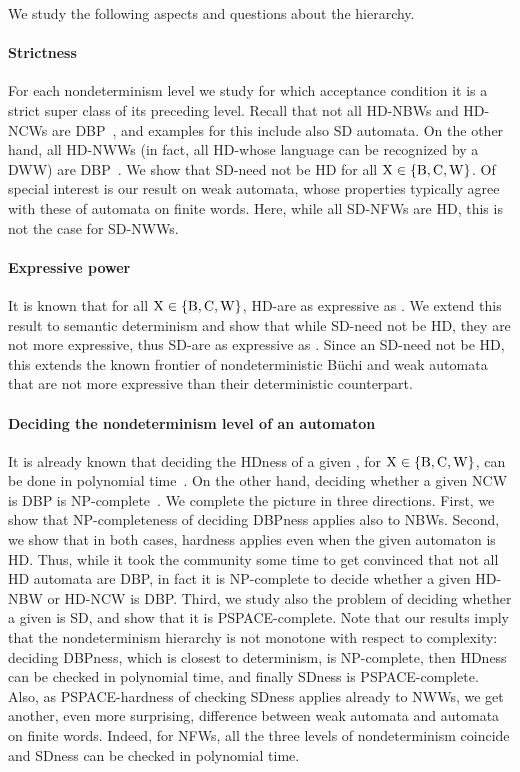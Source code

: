 \documentclass{lmcs}
\begin{document}
We study the following aspects and questions about the hierarchy. 

\paragraph{Strictness} For each nondeterminism level we study for which acceptance condition it is a strict super class of its preceding level. Recall that not all HD-NBWs and HD-NCWs are DBP~\cite{BKKS13}, and examples for this include also SD automata. On the other hand, all HD-NWWs (in fact, all HD-\nxws whose language can be recognized by a DWW) are DBP~\cite{BKS17}. We show that SD-\nxws need not be HD for all ${\rm X} \in \{{\rm B,C,W}\}$. Of special interest is our result on weak automata, whose properties typically agree with these of automata on finite words. Here, while all SD-NFWs are HD, this is not the case for SD-NWWs. 

\paragraph{Expressive power} It is known that for all ${\rm X} \in \{{\rm B,C,W}\}$, HD-\nxws are as expressive as \dxws. We extend this result to semantic determinism and show that while SD-\nxws need not be HD, they are not more expressive, thus SD-\nxws are as expressive as \dxws. Since an SD-\nxw need not be HD, this extends the known frontier of nondeterministic B\"uchi and weak automata that are not more expressive than their deterministic counterpart. 

\paragraph{Deciding the nondeterminism level of an automaton} It is already known that deciding the HDness of a given \nxw, for ${\rm X} \in \{{\rm B,C,W}\}$,  can be done in polynomial time~\cite{AKL10, KS15, BK18}. On the other hand, deciding whether a given NCW is DBP is NP-complete~\cite{KM18}. We complete the picture in three directions. First, we show that NP-completeness of deciding DBPness applies also to NBWs. Second, we show that in both cases, hardness applies even when the given automaton is HD. Thus, while it took the community some time to get convinced that not all HD automata are DBP, in fact it is NP-complete to decide whether a given HD-NBW or HD-NCW is DBP.  Third, we study also the problem of deciding whether a given \nxw is SD, and show that it is PSPACE-complete. Note that our results imply that the nondeterminism hierarchy is not monotone with respect to complexity: deciding DBPness, which is closest to determinism, is NP-complete, then HDness can be checked in polynomial time, and finally SDness is PSPACE-complete. Also, as PSPACE-hardness of checking SDness applies already to NWWs, we get another, even more surprising, difference between weak automata and automata on finite words. Indeed, for NFWs, all the three levels of nondeterminism coincide and SDness can be checked in polynomial time.  
\end{document}
